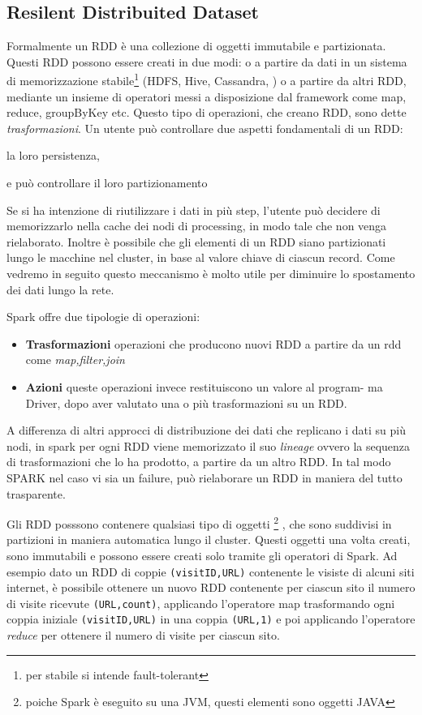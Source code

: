 \subsection{Resilent Distribuited Dataset}
Formalmente un RDD è una collezione di oggetti immutabile e partizionata.
Questi RDD possono essere creati in due modi: o a partire da dati in un sistema di memorizzazione stabile\footnote{per stabile si intende fault-tolerant} (HDFS, Hive, Cassandra, ) o a partire da altri RDD, mediante un insieme di operatori messi a disposizione dal framework come map, reduce, groupByKey etc. 
Questo tipo di  operazioni, che creano RDD, sono dette \emph{trasformazioni}.
Un utente può controllare due aspetti fondamentali di un RDD: 
\begin{inlinelist}
  \item la loro persistenza,
  \item e può controllare il loro partizionamento
  
\end{inlinelist}
Se si ha intenzione di riutilizzare i dati in più step, l'utente può decidere di memorizzarlo nella cache dei nodi di processing, in modo tale che non venga  rielaborato. Inoltre è possibile che gli elementi di un RDD siano partizionati lungo le macchine nel cluster, in base al valore chiave di ciascun record.
Come vedremo in seguito questo meccanismo è molto utile per diminuire lo spostamento dei dati lungo la rete.

  Spark offre due tipologie di operazioni:
\begin{itemize}
\item \textbf{Trasformazioni} operazioni che producono nuovi RDD a partire da un rdd come \emph{map,filter,join}
\item \textbf{Azioni} queste operazioni invece restituiscono un valore al program-
ma Driver, dopo aver valutato una o più trasformazioni su un RDD.
\end{itemize}
A differenza di altri approcci di distribuzione dei dati che replicano i dati su più nodi, in spark per ogni RDD viene memorizzato il suo \emph{lineage} ovvero la sequenza di trasformazioni che lo ha prodotto, a partire da un altro RDD. In tal modo SPARK nel caso vi sia un failure, può rielaborare un RDD in maniera del tutto trasparente.
 
Gli RDD posssono contenere qualsiasi tipo di oggetti \footnote{poiche Spark è eseguito su una JVM, questi elementi sono oggetti JAVA} , che sono suddivisi in
partizioni in maniera automatica lungo il cluster. Questi oggetti una volta
creati, sono immutabili e possono essere creati solo tramite gli operatori
di Spark.
Ad esempio dato un RDD di coppie \texttt{(visitID,URL)} contenente le visiste di
alcuni siti internet, è possibile ottenere un nuovo RDD contenente per ciascun
sito il numero di visite ricevute \texttt{(URL,count)}, applicando l’operatore map
trasformando ogni coppia iniziale \texttt{(visitID,URL)} in una coppia \texttt{(URL,1)} e
poi applicando l'operatore \emph{reduce} per ottenere il numero di visite per ciascun sito.


